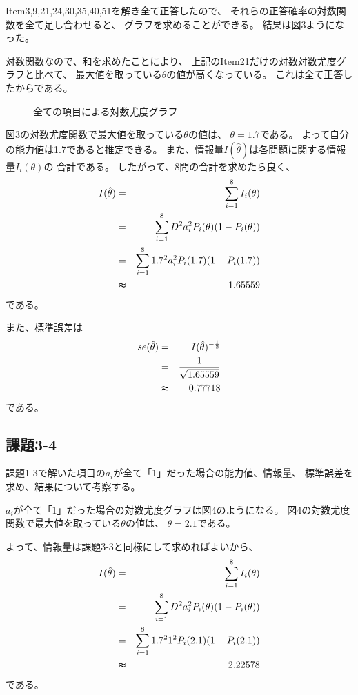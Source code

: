 \documentclass[12pt]{jarticle}
\begin{document}
Item3,9,21,24,30,35,40,51を解き全て正答したので、
それらの正答確率の対数関数を全て足し合わせると、
グラフを求めることができる。
結果は図3ようになった。

対数関数なので、和を求めたことにより、
上記のItem21だけの対数対数尤度グラフと比べて、
最大値を取っている$\theta$の値が高くなっている。
これは全て正答したからである。

\begin{figure}[h]
    \begin{center}
    \end{center}
    \caption{全ての項目による対数尤度グラフ}
\end{figure}
\clearpage


図3の対数尤度関数で最大値を取っている$\theta$の値は、
$\theta=1.7$である。
よって自分の能力値は1.7であると推定できる。
また、情報量$I(\hat{\theta})$は各問題に関する情報量$I_i({\theta})$の
合計である。
したがって、8問の合計を求めたら良く、
\begin{eqnarray*}
    I(\hat{\theta})&=&\sum_{i=1}^{8}{I_i({\theta})}\\
    &=&\sum_{i=1}^{8}{D^2a_i^2P_i(\theta)(1-P_i(\theta))}\\
    &=&\sum_{i=1}^{8}{1.7^2a_i^2P_i(1.7)(1-P_i(1.7))}\\
    &\thickapprox & 1.65559
\end{eqnarray*}
である。

また、標準誤差は
\begin{eqnarray*}
    se(\hat{\theta})&=&I(\hat{\theta})^{-\frac{1}{2}}\\
    &= &\frac{1}{\sqrt{ 1.65559}}\\
    &\thickapprox& 0.77718
\end{eqnarray*}
である。

\subsection{課題3-4}
\begin{shadebox}
    課題1-3で解いた項目の$a_i$が全て「1」だった場合の能力値、情報量、
    標準誤差を求め、結果について考察する。
\end{shadebox}



$a_i$が全て「1」だった場合の対数尤度グラフは図4のようになる。
図4の対数尤度関数で最大値を取っている$\theta$の値は、
$\theta=2.1$である。

よって、情報量は課題3-3と同様にして求めればよいから、
\begin{eqnarray*}
    I(\hat{\theta})&=&\sum_{i=1}^{8}{I_i({\theta})}\\
    &=&\sum_{i=1}^{8}{D^2a_i^2P_i(\theta)(1-P_i(\theta))}\\
    &=&\sum_{i=1}^{8}{1.7^2 1^2P_i(2.1)(1-P_i(2.1))}\\
    &\thickapprox & 2.22578
\end{eqnarray*}
である。
\end{document}
